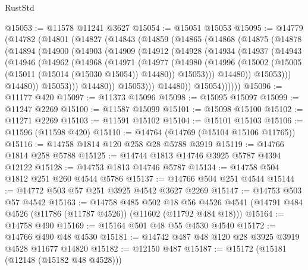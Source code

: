 \begin{lexlean}{RustStd}
\begin{coremodule}
@15053 := @11578 @11241 @3627
@15054 := @15051 @15053
@15095 := @14779
    (@14782
      (@14801
        (@14827
          (@14843
            (@14859
              (@14865
                (@14868
                  (@14875
                    (@14878
                      (@14894
                        (@14900
                          (@14903
                            (@14909
                              (@14912
                                (@14928
                                  (@14934
                                    (@14937
                                      (@14943
                                        (@14946
                                          (@14962
                                            (@14968
                                              (@14971
                                                (@14977
                                                  (@14980
                                                    (@14996
                                                      (@15002
                                                        (@15005
                                                          (@15011 (@15014 (@15030 @15054)) @14480))
                                                        @15053)))
                                                  @14480))
                                              @15053)))
                                        @14480))
                                    @15053)))
                              @14480))
                          @15053)))
                    @14480))
                @15054))))))
@15096 := @11177 @420
@15097 := @11373 @15096
@15098 := @15095 @15097
@15099 := @11247 @2269
@15100 := @11587 @15099
@15101 := @15098 @15100
@15102 := @11271 @2269
@15103 := @11591 @15102
@15104 := @15101 @15103
@15106 := @11596 (@11598 @420)
@15110 := @14764 (@14769 (@15104 @15106 @11765))
@15116 := @14758 @1814 @120 @258 @28 @5788 @3919
@15119 := @14766 @1814 @258 @5788
@15125 := @14744 @1813 @14746 @3925 @5787 @4394 @12122
@15128 := @14753 @1813 @14746 @5787
@15134 := @14758 @504 @1812 @251 @260 @4544 @5786
@15137 := @14766 @504 @251 @4544
@15144 := @14772 @503 @57 @251 @3925 @4542 @3627 @2269
@15147 := @14753 @503 @57 @4542
@15163 := @14758
    @485
    @502
    @18
    @56
    @4526
    @4541
    (@14791 @484 @4526 (@11786 (@11787 @4526)) (@11602 (@11792 @484 @18)))
@15164 := @14758 @490
@15169 := @15164 @501 @48 @55 @4530 @4540
@15172 := @14766 @490 @48 @4530
@15181 := @14742 @487 @48 @120 @28 @3925 @3919 @4528 @11677 @14820
@15182 := @12150 @487
@15187 := @15172 (@15181 (@12148 (@15182 @48 @4528)))

\end{coremodule}
\end{lexlean}
